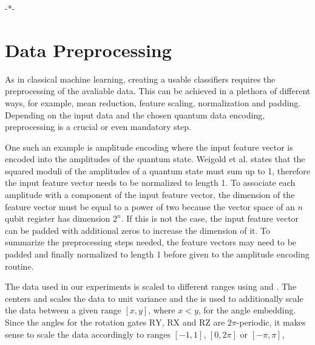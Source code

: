 -*-

\section{Data Preprocessing}

As in classical machine learning, creating a usable classifiers requires the preprocessing of the avaliable data. This can be achieved in a plethora of different ways, for example, mean reduction, feature scaling, normalization and padding. Depending on the input data and the chosen quantum data encoding, preprocessing is a crucial or even mandatory step\cite{PoincarDataPreprocessinForQuantumMachineLearning_2021,VariationalClassifierPennyLane,SHRIVASTAVA20201849}. 

One such an example is amplitude encoding where the input feature vector is encoded into the amplitudes of the quantum state. Weigold et al. \cite{Weigold2021_EncodingPatternsForQuantumAlgorithms} states that the squared moduli of the amplitudes of a quantum state must sum up to 1, therefore the input feature vector needs to be normalized to length 1. To associate each amplitude with a component of the input feature vector, the dimension of the feature vector must be equal to a power of two because the vector space of an $n$ qubit register has dimension $2^n$. If this is not the case, the input feature vector can be padded with additional zeros to increase the dimension of it. To summarize the preprocessing steps needed, the  feature vectors may need to be padded and finally normalized to length 1 before given to the amplitude encoding routine.

The data used in our experiments is scaled to different ranges using  \cite{scikit_sklearnpreprocessingminmaxscaler_nodate} and \cite{scikit_sklearnpreprocessingstandardscaler_nodate}. The  centers and scales the data to unit variance and the  is used to additionally scale the data between a given range $[x, y]$, where $x < y$, for the angle embedding. Since the angles for the rotation gates $\mathrm{RY}$, $\mathrm{RX}$ and $\mathrm{RZ}$ are $2\pi$-periodic, it makes sense to scale the data accordingly to ranges $[-1,1]$, $[0,2\pi]$\cite{schuld2021supervised} or $[-\pi,\pi]$, 

